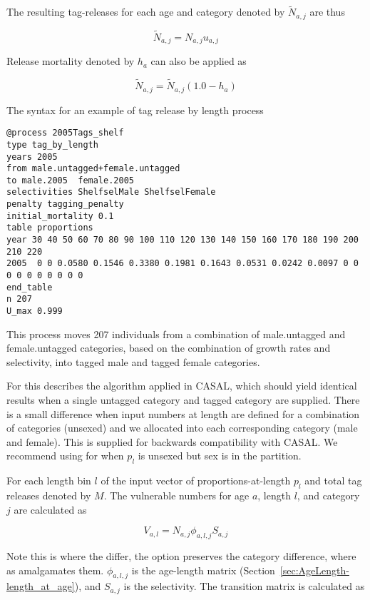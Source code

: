The resulting tag-releases for each age and category denoted by \(\widetilde{N}_{a,j}\) are thus

$$
\widetilde{N}_{a,j} = N_{a,j} u_{a,j}
$$

Release mortality denoted by \(h_a\) can also be applied as

$$\widetilde{N}_{a,j} = \widetilde{N}_{a,j}\left(1.0 - h_a\right)$$

The syntax for an example of tag release by length process

{\small{\begin{verbatim}
@process 2005Tags_shelf
type tag_by_length
years 2005
from male.untagged+female.untagged
to male.2005  female.2005
selectivities ShelfselMale ShelfselFemale
penalty tagging_penalty
initial_mortality 0.1
table proportions
year 30 40 50 60 70 80 90 100 110 120 130 140 150 160 170 180 190 200 210 220
2005  0 0 0.0580 0.1546 0.3380 0.1981 0.1643 0.0531 0.0242 0.0097 0 0 0 0 0 0 0 0 0 0
end_table
n 207
U_max 0.999
\end{verbatim}}}

This process moves 207 individuals from a combination of male.untagged and female.untagged categories, based on the combination of growth rates and selectivity, into tagged male and tagged female categories.

For  
this describes the algorithm applied in CASAL, which should yield identical results when a single untagged category and tagged category are supplied. There is a small difference when input numbers at length are defined for a combination of categories (unsexed) and we allocated into each corresponding category (male and female). This is supplied for backwards compatibility with CASAL. We recommend using  for when ${p}_l$ is unsexed but sex is in the partition.

For each length bin $l$ of the input vector of proportions-at-length ${p}_l$ and total tag releases denoted by \(M\). The vulnerable numbers for age \(a\), length \(l\), and category \(j\) are calculated as

$$V_{a,l} = N_{a,j} \phi_{a,l,j} S_{a,j}$$

Note this is where the  differ, the  option preserves the category difference, where as  amalgamates them. \(\phi_{a,l,j}\) is the age-length matrix (Section~\ref{sec:AgeLength-length_at_age}), and \(S_{a,j}\) is the selectivity. The transition matrix is calculated as

